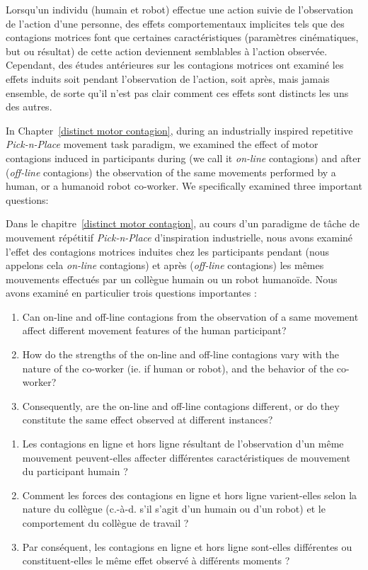 Lorsqu'un individu (humain et robot) effectue une action suivie de l'observation de l'action d'une personne, des effets comportementaux implicites tels que des contagions motrices font que certaines caractéristiques (paramètres cinématiques, but ou résultat) de cette action deviennent semblables à l'action observée. Cependant, des études antérieures sur les contagions motrices ont examiné les effets induits soit pendant l'observation de l'action, soit après, mais jamais ensemble, de sorte qu'il n'est pas clair comment ces effets sont distincts les uns des autres.



In Chapter~\ref{distinct motor contagion}, during an industrially inspired repetitive \textit{Pick-n-Place} movement task paradigm, we examined the effect of motor contagions induced in participants during (we call it \textit{on-line} contagions) and after (\textit{off-line} contagions) the observation of the same movements performed by a human, or a humanoid robot co-worker. We specifically examined three important questions:

Dans le chapitre~\ref{distinct motor contagion}, au cours d'un paradigme de tâche de mouvement répétitif \textit{Pick-n-Place} d'inspiration industrielle, nous avons examiné l'effet des contagions motrices induites chez les participants pendant (nous appelons cela \textit{on-line} contagions) et après (\textit{off-line} contagions) les mêmes mouvements effectués par un collègue humain ou un robot humanoïde. Nous avons examiné en particulier trois questions importantes :



\begin{enumerate}
	\item Can on-line and off-line contagions from the observation of a same movement affect different movement features of the human participant?
	\item How do the strengths of the on-line and off-line contagions vary with the nature of the co-worker (ie. if human or robot), and the behavior of the co-worker?
	\item Consequently, are the on-line and off-line contagions different, or do they constitute the same effect observed at different instances?
\end{enumerate}

\begin{enumerate}
	\item Les contagions en ligne et hors ligne résultant de l'observation d'un même mouvement peuvent-elles affecter différentes caractéristiques de mouvement du participant humain ?
	\item Comment les forces des contagions en ligne et hors ligne varient-elles selon la nature du collègue (c.-à-d. s'il s'agit d'un humain ou d'un robot) et le comportement du collègue de travail ?
	\item Par conséquent, les contagions en ligne et hors ligne sont-elles différentes ou constituent-elles le même effet observé à différents moments ?
\end{enumerate}



